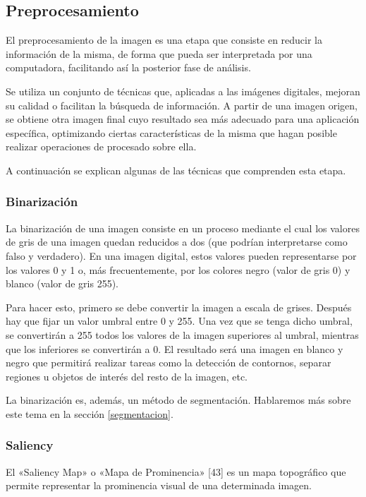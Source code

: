 \subsection{Preprocesamiento}\label{preprocesamiento}
El preprocesamiento de la imagen es una etapa que consiste en reducir la información de la
misma, de forma que pueda ser interpretada por una computadora, facilitando así la posterior fase de análisis.

Se utiliza un conjunto de técnicas que, aplicadas a las imágenes digitales, mejoran su calidad o facilitan la búsqueda de información. A partir de una imagen origen, se obtiene otra imagen final cuyo resultado sea más adecuado para una aplicación específica, optimizando ciertas características de la misma que hagan posible realizar operaciones de procesado sobre ella.

A continuación se explican algunas de las técnicas que comprenden esta etapa.


\subsubsection{Binarización}
La binarización de una imagen consiste en un proceso mediante el cual los valores de gris de una imagen quedan reducidos a dos (que podrían interpretarse como falso y verdadero). En una imagen digital, estos valores pueden representarse por los valores 0 y 1 o, más frecuentemente, por los colores negro (valor de gris 0) y blanco (valor de gris 255).

Para hacer esto, primero se debe convertir la imagen a escala de grises. Después hay que fijar
un valor umbral entre 0 y 255. Una vez que se tenga dicho umbral, se convertirán a 255 todos
los valores de la imagen superiores al umbral, mientras que los inferiores se convertirán a 0. El resultado será una imagen en blanco y negro que permitirá realizar tareas como la detección de contornos, separar regiones u objetos de interés del resto de la imagen, etc.

La binarización es, además, un método de segmentación. Hablaremos más sobre este tema en la sección \ref{segmentacion}.


\subsubsection{Saliency}\label{saliency}
El «Saliency Map» o «Mapa de Prominencia» [43] es un mapa topográfico que permite representar
la prominencia visual de una determinada imagen.

